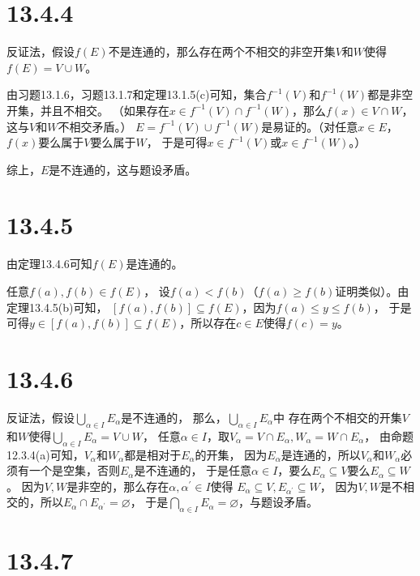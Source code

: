 \documentclass{article}
\begin{document}
\section*{13.4.4}

反证法，假设$f(E)$不是连通的，那么存在两个不相交的非空开集$V$和$W$使得$f(E) = V \cup W$。

由习题13.1.6，习题13.1.7和定理13.1.5(c)可知，集合$f^{-1}(V)$和$f^{-1}(W)$都是非空开集，并且不相交。
（如果存在$x \in f^{-1}(V) \cap f^{-1}(W)$，那么$f(x) \in V \cap W$，这与$V$和$W$不相交矛盾。）
$E = f^{-1}(V) \cup f^{-1}(W)$是易证的。（对任意$x \in E$，$f(x)$要么属于$V$要么属于$W$，
于是可得$x \in f^{-1}(V)$或$x \in f^{-1}(W)$。）

综上，$E$是不连通的，这与题设矛盾。

\section*{13.4.5}

由定理13.4.6可知$f(E)$是连通的。

任意$f(a), f(b) \in f(E)$，
设$f(a) < f(b)$（$f(a) \geq f(b)$证明类似）。由定理13.4.5(b)可知，
$[f(a), f(b)] \subseteq f(E)$，因为$f(a) \leq y \leq f(b)$，
于是可得$y \in [f(a), f(b)] \subseteq f(E)$，所以存在$c \in E$使得$f(c) = y$。

\section*{13.4.6}

反证法，假设$\bigcup\limits_{\alpha \in I} E_{\alpha}$是不连通的，
那么，$\bigcup\limits_{\alpha \in I} E_{\alpha}$中
存在两个不相交的开集$V$和$W$使得$\bigcup\limits_{\alpha \in I} E_{\alpha} = V \cup W$，
任意$\alpha \in I$，取$V_{\alpha} = V \cap E_{\alpha}, W_{\alpha} = W \cap E_{\alpha}$，
由命题12.3.4(a)可知，$V_{\alpha}$和$W_{\alpha}$都是相对于$E_{\alpha}$的开集，
因为$E_{\alpha}$是连通的，所以$V_\alpha$和$W_{\alpha}$必须有一个是空集，否则$E_{\alpha}$是不连通的，
于是任意$\alpha \in I$，要么$E_{\alpha} \subseteq V$要么$E_{\alpha} \subseteq W$。
因为$V, W$是非空的，那么存在$\alpha, \alpha ^\prime \in I$使得
$E_{\alpha} \subseteq V, E_{\alpha ^\prime} \subseteq W$，
因为$V, W$是不相交的，所以$E_{\alpha} \cap E_{\alpha ^\prime} = \varnothing$，
于是$\bigcap\limits_{\alpha \in I} E_{\alpha} = \varnothing$，与题设矛盾。

\section*{13.4.7}
\end{document}
